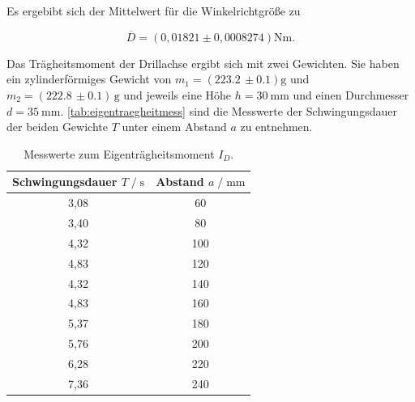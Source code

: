 Es ergebibt sich der Mittelwert für die Winkelrichtgröße zu

\begin{equation}
  \overline D = (0,01821\pm 0,0008274) \si{\newton\meter}.
\end{equation}


Das Trägheitsmoment der Drillachse ergibt sich mit zwei Gewichten.
Sie haben ein zylinderförmiges Gewicht von $m_1 = (223.2 \,\pm 0.1) \text{g}$ und $m_2 = (222.8 \,\pm 0.1)\, \text{g}$ und jeweils eine
Höhe $h=\SI{30}{\milli\meter}$ und einen Durchmesser $d=\SI{35}{\milli\meter}$.
\autoref{tab:eigentraegheitmess} sind die Messwerte der Schwingungsdauer der beiden Gewichte $T$ unter einem Abstand $a$ zu entnehmen.

\begin{table}[H]
  \centering
   \caption{Messwerte zum Eigenträgheitsmoment $I_D$.}
   \label{tab:eigentraegheitmess}
   \begin{tabular}{c c}
       \toprule
       Schwingungsdauer $ T \;/\; \si{\second}$ & Abstand $a \;/\; \si{\milli\meter}$ \\
       \midrule
       3,08 & 60 \\
       3,40 & 80 \\
       4,32 & 100 \\
       4,83 & 120 \\
       4,32 & 140 \\
       4,83 & 160 \\
       5,37 & 180 \\
       5,76 & 200 \\
       6,28 & 220 \\
       7,36 & 240 \\
       \bottomrule
   \end{tabular}
\end{table}





